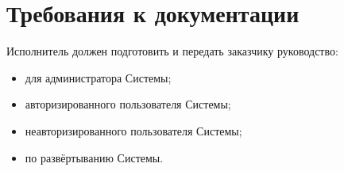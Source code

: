 \section*{Требования к документации}
Исполнитель должен подготовить и передать заказчику руководство:
\begin{itemize}
	\item для администратора Системы;
	
	\item авторизированного пользователя Системы;
	
	\item неавторизированного пользователя Системы;
	
	\item по развёртыванию Системы.
\end{itemize}

\pagebreak